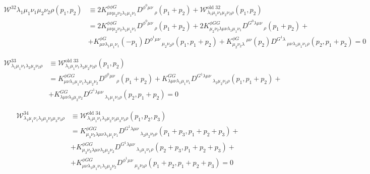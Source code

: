 \documentclass[11pt, oneside]{article}   	%
\newcommand{\W}{\mathcal{W}}
\begin{document}
\begin{equation} \begin{split} \W^{32}{\lambda_1 \mu_1 \nu_ 1 \mu_2 \nu_2 \rho} (p_1, p_2 )&\equiv 2 K^{\phi \phi G}_{\mu\nu \mu_2 \nu_2 \lambda_1 \mu_1 \nu_1} D^{\phi^{0} \mu\nu}\,_{\rho} (p_1 + p_2) + \W^{\text{old }32}_{\lambda_1 \mu_1 \nu_ 1 \mu_2 \nu_2 \rho} (p_1 , p_2 ) \\ &= 2 K^{\phi \phi G}_{\mu\nu \mu_2 \nu_2 \lambda_1 \mu_1 \nu_1} D^{\phi^{0} \mu\nu}\,_{\rho} (p_1 + p_2) +  2K^{\phi G G}_{\mu_2 \nu_2 \lambda \mu \nu \lambda_1 \mu_1 \nu_1} D^{G^{0} \lambda \mu \nu}\,_{\rho} (p_1 + p_2 ) + \\ &+K^{\phi G}_{\mu \nu \lambda_1 \mu_1 \nu_1 } (-p_1 ) D^{\phi^{1} \mu \nu}\,_{\mu_2 \nu_2 \rho} (p_1 , p_1 + p_2 ) + K^{\phi G}_{\mu_2 \nu_2 \lambda}\,^{\mu\nu}(p_2 )D^{G^{1} \lambda}\,_{\mu\nu\lambda_1 \mu_1 \nu_1 \rho} (p_2 , p_1 + p_2 ) = 0\end{split}  \end{equation}

\begin{equation} \begin{split} \W^{33}_{\lambda_1 \mu_1 \nu_ 1 \lambda_2 \mu_2 \nu_2 \rho} &\equiv \W^{\text{old }33}_{\lambda_1 \mu_1 \nu_ 1 \lambda_2 \mu_2 \nu_2 \rho} (p_1 , p_2 ) \\ &= K^{\phi G G}_{\mu \nu \lambda_1 \mu_1 \nu_1 \lambda_2 \mu_2 \nu_2} D^{\phi^{0} \mu \nu}\,_{\rho} (p_1 + p_2 ) + K^{GG}_{\lambda \mu \nu \lambda_1 \mu_1 \nu_1 } D^{G^{1} \lambda \mu \nu}\,_{\lambda_2\mu_2 \nu_2 \rho} (p_1 , p_1 + p_2 ) + \\ &+ K^{GG}_{\lambda \mu\nu \lambda_2 \mu_2 \nu_2}D^{G^{1}\lambda \mu \nu}\,_{\lambda_1 \mu_1 \nu_1 \rho} (p_2 , p_1 + p_2 ) = 0 \end{split}  \end{equation}

\begin{equation}  \begin{split} \W^{34}_{\lambda_1 \mu_1 \nu_ 1 \lambda_2 \mu_2 \nu_2 \mu_3 \nu_3 \rho} &\equiv \W^{\text{old }34}_{\lambda_1 \mu_1 \nu_ 1 \lambda_2 \mu_2 \nu_2 \mu_3 \nu_3 \rho} (p_1 , p_2 , p_3 ) \\ &= K^{\phi G G}_{\mu_3 \nu_3 \lambda \mu \nu \lambda_1 \mu_1 \nu_1} D^{G^{1} \lambda \mu \nu}\,_{\lambda_2 \mu_2 \nu_2 \rho} (p_1 + p_3 , p_1 +p_2 + p_3 ) +\\ &+ K^{\phi G G}_{\mu_3 \nu_3 \lambda \mu \nu \lambda_2 \mu_2 \nu_2} D^{G^{1} \lambda \mu \nu}\,_{\lambda_1 \mu_1 \nu_1 \rho} (p_2 + p_3 , p_1 +p_2 + p_3 ) + \\ &+ K^{\phi G G}_{\mu \nu \lambda_1 \mu_1 \nu_1 \lambda_2 \mu_2 \nu_2} D^{\phi^{1}\mu \nu}\,_{\mu_3 \nu_3 \rho} (p_1 + p_2 , p_1 +p_2 + p_3 ) = 0\end{split}  \end{equation}
\end{document}
